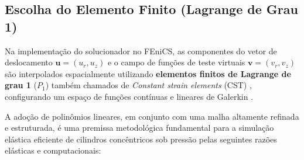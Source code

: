 

\subsection{Escolha do Elemento Finito (Lagrange de Grau 1)}

Na implementação do solucionador no FEniCS, as componentes do vetor de deslocamento $\mathbf{u} = (u_r, u_z)$ e o campo de funções de teste virtuais $\mathbf{v} = (v_r, v_z)$ são interpolados espacialmente utilizando \textbf{elementos finitos de Lagrange de grau 1} ($P_1$) também chamados de \textit{Constant strain elements} (CST) \cite{Sadd2009}, configurando um espaço de funções contínuas e lineares de Galerkin \cite{logg2012automated}.

A adoção de polinômios lineares, em conjunto com uma malha altamente refinada e estruturada, é uma premissa metodológica fundamental para a simulação elástica eficiente de cilindros concêntricos sob pressão pelas seguintes razões elásticas e computacionais:



